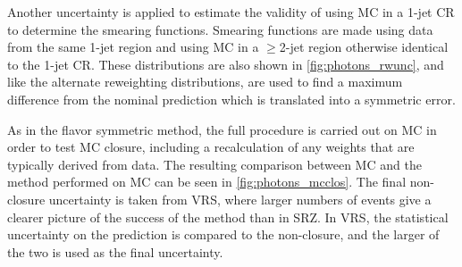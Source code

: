 Another uncertainty is applied to estimate the validity of using \ac{MC} in a 1-jet \ac{CR} to determine the smearing functions. Smearing functions are made using data from the same 1-jet region and using \ac{MC} in a $\geq$2-jet region otherwise identical to the 1-jet \ac{CR}. These distributions are also shown in \autoref{fig:photons_rwunc}, and like the alternate reweighting distributions, are used to find a maximum difference from the nominal prediction which is translated into a symmetric error. 

As in the flavor symmetric method, the full procedure is carried out on \ac{MC} in order to test \ac{MC} closure, including a recalculation of any weights that are typically derived from data. The resulting comparison between \dyjets \ac{MC} and the \gjets method performed on \ac{MC} can be seen in \autoref{fig:photons_mcclos}. The final non-closure uncertainty is taken from VRS, where larger numbers of events give a clearer picture of the success of the method than in SRZ. In VRS, the statistical uncertainty on the prediction is compared to the non-closure, and the larger of the two is used as the final uncertainty. 

